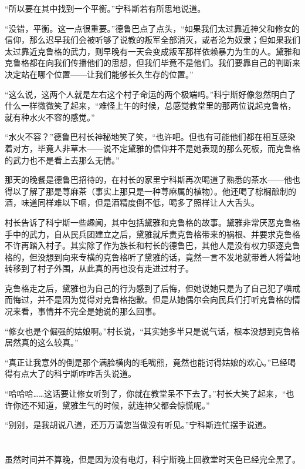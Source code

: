 “所以要在其中找到一个平衡。”宁科斯若有所思地说道。

“没错，平衡。这一点很重要。”德鲁巴点了点头，“如果我们太过靠近神父和修女的信仰，那么迟早我们会被听够了说教的叛军全部消灭，或者沦为奴隶；但如果我们太过靠近克鲁格的武力，则早晚有一天会变成叛军那样依赖暴力为生的人。黛雅和克鲁格都在向我们传播他们的思想，但我们毕竟不是他们。我们要靠自己的判断来决定站在哪个位置——让我们能够长久生存的位置。”

“这么说，这两个人就是左右这个村子命运的两个极端吗。”科宁斯好像忽然明白了什么一样微微笑了起来，“难怪上午的时候，总感觉教堂里的那两位说起克鲁格，就有种水火不容的感觉。”

“水火不容？”德鲁巴村长神秘地笑了笑，“也许吧。但也有可能他们都在相互感染着对方，毕竟人非草木——说不定黛雅的信仰并不是她表现的那么死板，而克鲁格的武力也不是看上去那么无情。”

那天的晚餐是德鲁巴招待的，在村长的家里宁科斯再次喝道了熟悉的茶水——他也得以了解了那是荨麻茶（事实上那只是一种荨麻属的植物）。他还喝了棕榈酿制的酒，味道同样难以下咽，但是酒精度倒不低，喝多了照样让人大舌头。

村长告诉了科宁斯一些趣闻，其中包括黛雅和克鲁格的故事。黛雅非常厌恶克鲁格手中的武力，自从民兵团建立之后，黛雅就斥责克鲁格带来的祸根、并要求克鲁格不许再踏入村子。其实除了作为族长和村长的德鲁巴，其他人是没有权力驱逐克鲁格的，但没想到向来专横的克鲁格听了黛雅的话，竟然一言不发地就带着人将营地转移到了村子外围，从此真的再也没有走进过村子。

克鲁格走之后，黛雅也为自己的行为感到了后悔，但她说她只是为了自己犯了嗔戒而悔过，并不是因为觉得对克鲁格抱歉。但是从她偶尔会向民兵们打听克鲁格的情况来看，事情并不完全是她说的那么回事。

“修女也是个倔强的姑娘啊。”村长说，“其实她多半只是说气话，根本没想到克鲁格居然真的这么较真。”

“真正让我意外的倒是那个满脸横肉的毛嘴熊，竟然也能讨得姑娘的欢心。”已经喝得有点大了的科宁斯咋咋舌头说道。

“哈哈哈……这话要让修女听到了，你就在教堂呆不下去了。”村长大笑了起来，“也许你还不知道，黛雅生气的时候，就连神父都会惊慌呢。”

“别别，是我胡说八道，还万万请您当做没有听见。”宁科斯连忙摆手说道。

\section*{}

虽然时间并不算晚，但是因为没有电灯，科宁斯晚上回教堂时天色已经完全黑了。

